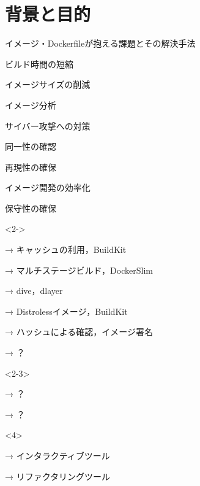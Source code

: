 \documentclass[dvipdfmx, 12pt]{beamer}
\begin{document}
\section{背景と目的}

\begin{frame}{イメージ・Dockerfileが抱える課題とその解決手法}
    \begin{multicols}{2}
        \begin{list}{}{\setlength{\itemsep}{1.0zh}}
            \setlength{\itemindent}{-3.0zw}
            \item ビルド時間の短縮
            \item イメージサイズの削減
            \item イメージ分析
            \item サイバー攻撃への対策
            \item 同一性の確認
            \item 再現性の確保
            \item イメージ開発の効率化
            \item 保守性の確保
        \columnbreak
        \setlength{\itemindent}{-4.6zw}
            \begin{onlyenv}<2->
                \item[→] キャッシュの利用，BuildKit
                \item[→] マルチステージビルド，DockerSlim
                \item[→] dive，dlayer
                \item[→] Distrolessイメージ，BuildKit
                \item[→] ハッシュによる確認，イメージ署名
                \item[→] ？
            \end{onlyenv}
            \begin{onlyenv}<2-3>
                \item[→] ？
                \item[→] ？
            \end{onlyenv}
            \begin{onlyenv}<4>
                \item[→] \textcolor{red!75}{インタラクティブツール}
                \item[→] \textcolor{red!75}{リファクタリングツール}
            \end{onlyenv}
        \end{list}
    \end{multicols}


\end{frame}
\end{document}
